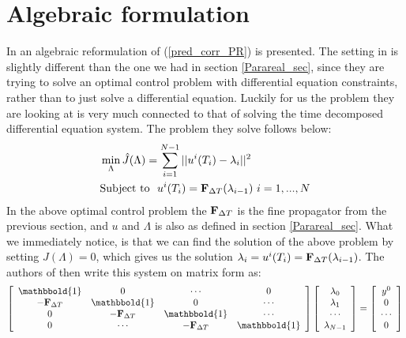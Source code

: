 \section{Algebraic formulation}\label{algebraic_sec}
In \cite{maday2002parareal} an algebraic reformulation of (\ref{pred_corr_PR}) is presented. The setting in \cite{maday2002parareal} is slightly different than the one we had in section \ref{Parareal_sec}, since they are trying to solve an optimal control problem with differential equation constraints, rather than to just solve a differential equation. Luckily for us the problem they are looking at is very much connected to that of solving the time decomposed differential equation system. The problem they solve follows below:
\begin{align*}
&\min_{\Lambda}\hat{J}(\Lambda) = \sum_{i=1}^{N-1} ||u^{i}(T_{i})-\lambda_{i}||^2 \\
&\textrm{Subject to } \ u^{i}(T_{i}) = \bold F_{\Delta T}(\lambda_{i-1}) \ i=1,...,N
\end{align*}
In the above optimal control problem the $\bold F_{\Delta T}$ is the fine propagator from the previous section, and $u$ and $\Lambda$ is also as defined in section \ref{Parareal_sec}. What we immediately notice, is that we can find the solution of the above problem by setting $J(\Lambda)=0$, which gives us the solution $\lambda_{i}= u^{i}(T_{i})=\bold F_{\Delta T}(\lambda_{i-1})$. The authors of \cite{maday2002parareal} then write this system on matrix form as:
\begin{align}
  \left[ \begin{array}{cccc}
   \mathbbold{1} & 0 & \cdots & 0 \\  
   -\bold{F}_{\Delta T} & \mathbbold{1} & 0 & \cdots \\ 
   0 &-\bold{F}_{\Delta T} & \mathbbold{1}  & \cdots \\
   0 &\cdots &-\bold{F}_{\Delta T} & \mathbbold{1}  \\
   \end{array}  \right] 
   \left[ \begin{array}{c}
   \lambda_0 \\
   \lambda_1 \\
   \cdots \\
   \lambda_{N-1} \\
   \end{array}  \right] =
   \left[ \begin{array}{c}
   y^0 \\
   0 \\
   \cdots \\
   0 \\
   \end{array}  \right] \label{vir_mat_form_sys }
\end{align}
